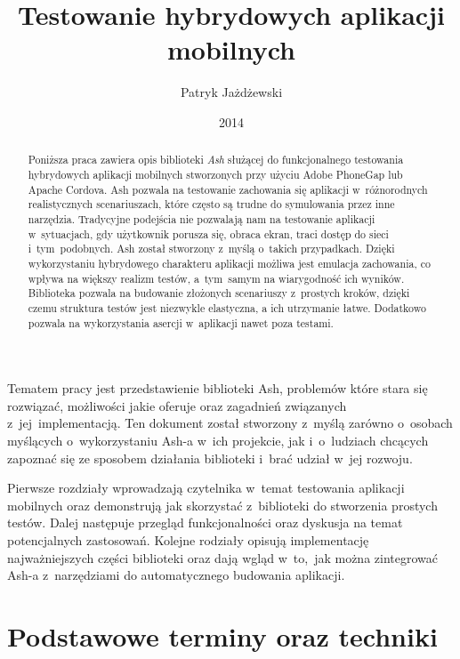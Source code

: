 \documentclass[brudnopis]{xmgr}
\author   {Patryk Jażdżewski}
\title    {Testowanie hybrydowych aplikacji mobilnych}
\date     {2014}
\begin{document}
\begin{abstract}
  Poniższa praca zawiera opis biblioteki \textit{Ash} służącej do funkcjonalnego testowania
hybrydowych aplikacji mobilnych stworzonych przy użyciu Adobe PhoneGap lub
Apache Cordova. Ash pozwala na testowanie zachowania się aplikacji w~różnorodnych
realistycznych scenariuszach, które często są trudne do symulowania przez inne narzędzia. Tradycyjne podejścia nie pozwalają nam na testowanie aplikacji w~sytuacjach, gdy  użytkownik porusza się,
obraca ekran, traci dostęp do sieci i~tym~podobnych. Ash został stworzony z~myślą o~takich przypadkach. Dzięki wykorzystaniu hybrydowego charakteru aplikacji
możliwa jest emulacja zachowania, co wpływa na większy realizm testów, a~tym~samym na wiarygodność ich wyników. 
Biblioteka pozwala na budowanie złożonych scenariuszy z~prostych kroków, dzięki czemu struktura testów jest niezwykle elastyczna, a ich utrzymanie łatwe. 
Dodatkowo pozwala na wykorzystania asercji w~aplikacji nawet poza testami. 

\end{abstract}

\maketitle

\introduction

Tematem pracy jest przedstawienie biblioteki Ash, problemów które stara się rozwiązać, możliwości jakie oferuje oraz zagadnień związanych z~jej~implementacją. Ten dokument  został stworzony z~myślą zarówno o~osobach myślących o~wykorzystaniu Ash-a w~ich projekcie, jak i~o~ludziach chcących zapoznać się ze sposobem działania biblioteki i~brać udział w~jej rozwoju.  

Pierwsze rozdziały wprowadzają czytelnika w~temat testowania aplikacji mobilnych oraz demonstrują jak skorzystać z~biblioteki do stworzenia prostych testów. Dalej następuje przegląd funkcjonalności oraz dyskusja na temat potencjalnych zastosowań. Kolejne rodziały opisują implementację najważniejszych części biblioteki oraz dają wgląd w~to,~jak można zintegrować Ash-a z~narzędziami do automatycznego budowania aplikacji.

\chapter{Podstawowe terminy oraz techniki}
\end{document}

